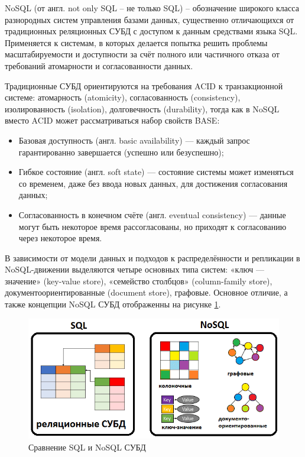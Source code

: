 NoSQL (от англ. not only SQL -- не только SQL) -- обозначение широкого класса
разнородных систем управления базами данных, существенно отличающихся от
традиционных реляционных СУБД с доступом к данным средствами языка SQL.
Применяется к системам, в которых делается попытка решить проблемы
масштабируемости и доступности за счёт полного или частичного отказа от
требований атомарности и согласованности данных.

Традиционные СУБД ориентируются на требования ACID к транзакционной системе:
атомарность (atomicity), согласованность (consistency), изолированность
(isolation), долговечность (durability), тогда как в NoSQL вместо ACID может
рассматриваться набор свойств BASE:
\begin{itemize}
    \item Базовая доступность (англ. basic availability) — каждый запрос гарантированно завершается (успешно или безуспешно);
    \item Гибкое состояние (англ. soft state) — состояние системы может изменяться со временем, даже без ввода новых данных, для достижения согласования данных;
    \item Согласованность в конечном счёте (англ. eventual consistency) — данные могут быть некоторое время рассогласованы, но приходят к согласованию через некоторое время.
\end{itemize}


В зависимости от модели данных и подходов к распределённости и репликации в
NoSQL-движении выделяются четыре основных типа систем: «ключ — значение»
(key-value store), «семейство столбцов» (column-family store),
документоориентированные (document store), графовые. Основное отличие, а также
концепции NoSQL СУБД отображенны на рисунке \ref{fig:sql-vs-nosql}.
\begin{figure}[H]
    \centering
    \includegraphics[scale=0.60]{inc/img/sql-vs-nosql.png}
    \caption{Сравнение SQL и NoSQL СУБД}
    \label{fig:sql-vs-nosql}
\end{figure}

